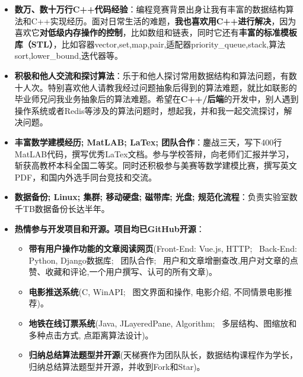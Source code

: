 \documentclass{resume}
\begin{document}
\begin{itemize}
	\item \textbf{数万、数十万行C++代码经验}：编程竞赛背景出身让我有丰富的数据结构算法和C++实现经历。面对日常生活的难题，\textbf{我也喜欢用C++进行解决}，因为喜欢它\textbf{对低级内存操作的控制}，比如数组和链表，同时它还有\textbf{丰富的标准模板库（STL）}，比如容器vector,set,map,pair,适配器priority\_queue,stack,算法sort,lower\_bound,迭代器等。
	\item \textbf{积极和他人交流和探讨算法}：乐于和他人探讨常用数据结构和算法问题，有数十人次。特别喜欢他人请教我经过问题抽象后得到的算法难题，就比如联影的毕业师兄问我业务抽象后的算法难题。希望在\textbf{C++/后端}的开发中，别人遇到操作系统或者Redis等涉及的算法问题时，想起我，并和我一起交流探讨，解决问题。
	\item \textbf{丰富数学建模经历; MatLAB; LaTex; 团队合作}：鏖战三天，写下400行MatLAB代码，撰写优秀LaTex文档。参与学校答辩，向老师们汇报并学习，斩获高教杯本科全国二等奖。同时还积极参与美赛等数学建模比赛，撰写英文PDF，和国内外选手同台竞技和交流。
	\item \textbf{数据备份; Linux; 集群; 移动硬盘; 磁带库; 光盘; 规范化流程}：负责实验室数千TB数据备份长达半年。
	\item \textbf{热情参与开发项目和开源。项目均已GitHub开源}：
		\begin{itemize}
			\item \textbf{带有用户操作功能的文章阅读网页}(Front-End: Vue.js, HTTP; \, Back-End: Python, Django数据库; \, 团队合作; \, 用户和文章增删查改,用户对文章的点赞、收藏和评论,一个用户撰写、认可的所有文章)。
			\item \textbf{电影推送系统}(C, WinAPI; \, 图文界面和操作, 电影介绍, 不同情景电影推荐)。
			\item \textbf{地铁在线订票系统}(Java, JLayeredPane, Algorithm; \, 多层结构、图缩放和多种点击方式, 点距离算法设计)。
			\item \textbf{归纳总结算法题型并开源}(天梯赛作为团队队长，数据结构课程作为学长，归纳总结算法题型并开源，并收到Fork和Star)。
		\end{itemize}
\end{itemize}
\end{document}
